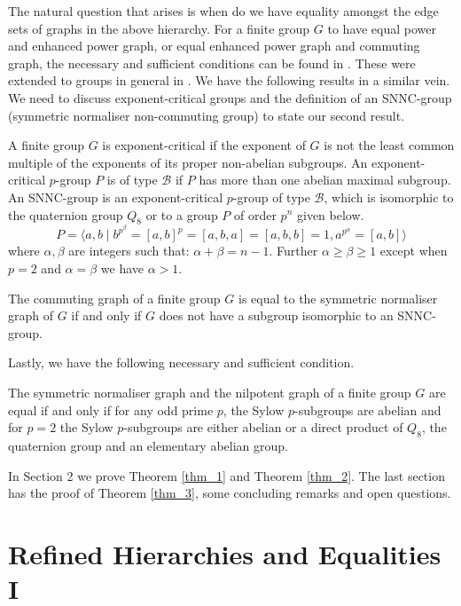 The natural question that arises is when do we have equality amongst the edge sets of graphs in the above hierarchy. For a finite group $G$ to have equal power and enhanced power graph, or equal enhanced power graph and commuting graph, the necessary and sufficient conditions can be found in \cite{PJC2022}. These were extended to groups in general in \cite{SV2024_2}. We have the following results in a similar vein. We need to discuss exponent-critical groups \cite{BCMV2025} and the definition of an SNNC-group (symmetric normaliser non-commuting group) to state our second result.

A finite group $G$ is exponent-critical if the exponent of $G$ is not the least common multiple of the exponents of its proper non-abelian subgroups. An exponent-critical $p$-group $P$ is of type $\mathcal{B}$ if $P$ has more than one abelian maximal subgroup. An SNNC-group is an exponent-critical $p$-group of type $\mathcal{B}$, which is isomorphic to the quaternion group $Q_8$ or to a group $P$ of order $p^n$ given below.
$$P =\langle a,b \mid b^{p^{\beta}} = [a,b]^p = [a,b,a] = [a,b,b] = 1, a^{p^{\alpha}} = [a,b]  \rangle$$ where $\alpha, \beta$ are integers such that: $\alpha + \beta = n-1$. Further $\alpha \geq \beta \geq 1$ except when $p=2$ and $\alpha = \beta$ we have $\alpha > 1$.

\begin{thm}\label{thm_2}
    The commuting graph of a finite group $G$ is equal to the symmetric normaliser graph of $G$ if and only if $G$ does not have a subgroup isomorphic to an SNNC-group.
\end{thm}

Lastly, we have the following necessary and sufficient condition.

\begin{thm}\label{thm_3}
    The symmetric normaliser graph and the nilpotent graph of a finite group $G$ are equal if and only if for any odd prime $p$, the Sylow $p$-subgroups are abelian and for $p=2$ the Sylow $p$-subgroups are either abelian or a direct product of $Q_8$, the quaternion group and an elementary abelian group.
\end{thm}

In Section 2 we prove Theorem \ref{thm_1} and Theorem \ref{thm_2}. The last section has the proof of Theorem \ref{thm_3}, some concluding remarks and open questions.  

\section{Refined Hierarchies and Equalities I}

